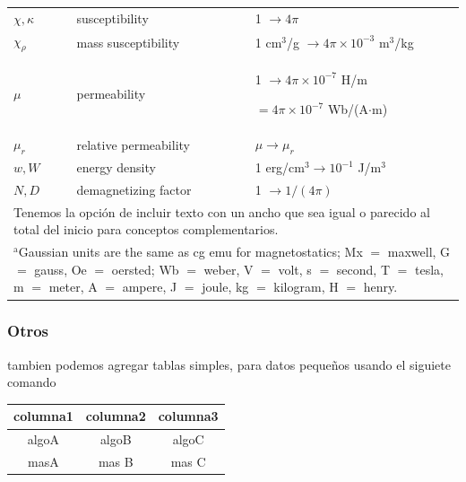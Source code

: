 \documentclass[a4paper]{IEEEtran} %
\begin{document}
\begin{table}
\begin{tabular}{|p{25pt}|p{75pt}|p{115pt}|}
$\chi, \kappa $& susceptibility                        & 1 $\to  4\pi $ \\
$\chi_{\rho }$ & mass susceptibility                    & 1 cm$^{3}$/g $\to  4\pi \times  10^{-3}$ m$^{3}$/kg \\
$\mu $         & permeability                           & 1 $\to  4\pi \times  10^{-7}$ H/m \par $= 4\pi \times  10^{-7}$ Wb/(A$\cdot $m) \\
$\mu_{r}$      & relative permeability                  & $\mu \to \mu_{r}$ \\
$w, W$         & energy density                         & 1 erg/cm$^{3} \to  10^{-1}$ J/m$^{3}$ \\
$N, D$         & demagnetizing factor                   & 1 $\to  1/(4\pi )$ \\
\hline
\multicolumn{3}{p{251pt}}{Tenemos la opción de incluir texto con un ancho que sea igual o parecido al total del inicio para conceptos complementarios.}\\ %
\multicolumn{3}{p{251pt}}{$^{\mathrm{a}}$Gaussian units are the same as cg emu for magnetostatics; Mx
$=$ maxwell, G $=$ gauss, Oe $=$ oersted; Wb $=$ weber, V $=$ volt, s $=$
second, T $=$ tesla, m $=$ meter, A $=$ ampere, J $=$ joule, kg $=$
kilogram, H $=$ henry.} %
\end{tabular}
\end{table}

\subsubsection{Otros}

tambien podemos agregar tablas simples, para datos pequeños usando el siguiete comando

\begin{tabular}{ccc}  %
\hline
columna1 & columna2 & columna3 \\
\hline
algoA    & algoB    & algoC \\
masA     & mas B    & mas C
\end{tabular}
\end{document}
